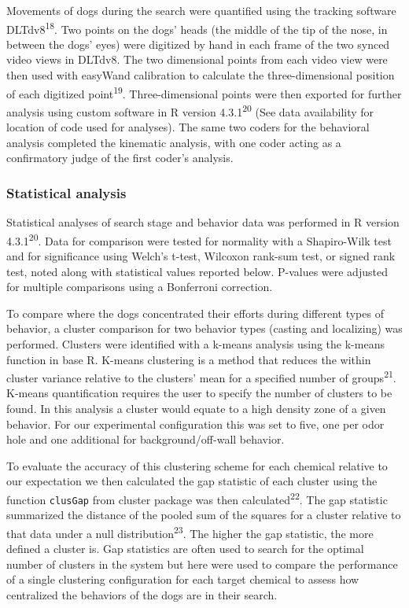 \documentclass[
]{article}
\begin{document}
Movements of dogs during the search were quantified using the tracking software DLTdv8\textsuperscript{18}. Two points on the dogs' heads (the middle of the tip of the nose, in between the dogs' eyes) were digitized by hand in each frame of the two synced video views in DLTdv8. The two dimensional points from each video view were then used with easyWand calibration to calculate the three-dimensional position of each digitized point\textsuperscript{19}. Three-dimensional points were then exported for further analysis using custom software in R version 4.3.1\textsuperscript{20} (See data availability for location of code used for analyses). The same two coders for the behavioral analysis completed the kinematic analysis, with one coder acting as a confirmatory judge of the first coder's analysis.

\hypertarget{statistical-analysis}{%
\subsubsection{Statistical analysis}\label{statistical-analysis}}

Statistical analyses of search stage and behavior data was performed in R version 4.3.1\textsuperscript{20}. Data for comparison were tested for normality with a Shapiro-Wilk test and for significance using Welch's t-test, Wilcoxon rank-sum test, or signed rank test, noted along with statistical values reported below. P-values were adjusted for multiple comparisons using a Bonferroni correction.

To compare where the dogs concentrated their efforts during different types of behavior, a cluster comparison for two behavior types (casting and localizing) was performed. Clusters were identified with a k-means analysis using the k-means function in base R. K-means clustering is a method that reduces the within cluster variance relative to the clusters' mean for a specified number of groups\textsuperscript{21}. K-means quantification requires the user to specify the number of clusters to be found. In this analysis a cluster would equate to a high density zone of a given behavior. For our experimental configuration this was set to five, one per odor hole and one additional for background/off-wall behavior.

To evaluate the accuracy of this clustering scheme for each chemical relative to our expectation we then calculated the gap statistic of each cluster using the function \texttt{clusGap} from cluster package was then calculated\textsuperscript{22}. The gap statistic summarized the distance of the pooled sum of the squares for a cluster relative to that data under a null distribution\textsuperscript{23}. The higher the gap statistic, the more defined a cluster is. Gap statistics are often used to search for the optimal number of clusters in the system but here were used to compare the performance of a single clustering configuration for each target chemical to assess how centralized the behaviors of the dogs are in their search.
\end{document}
